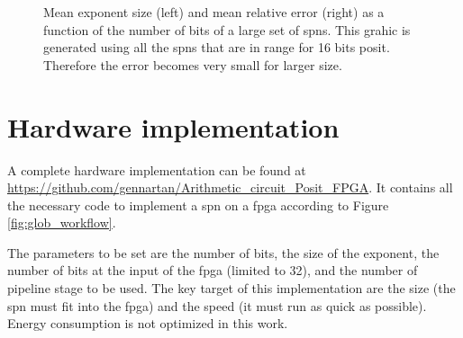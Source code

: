 \begin{figure}[!ht]
\begin{mdframed}
\centering
{}
\caption{Mean exponent size (left) and mean relative error (right) as a function of the number of bits of a large set of \glspl{spn}. This grahic is generated using all the \glspl{spn} that are in range for 16 bits posit. Therefore the error becomes very small for larger size.}
\label{fig:res_mean_2}
\end{mdframed}
\end{figure}

\section{Hardware implementation}

A complete hardware implementation can be found at \url{https://github.com/gennartan/Arithmetic_circuit_Posit_FPGA}. It contains all the necessary code to implement a \gls{spn} on a \gls{fpga} according to Figure \ref{fig:glob_workflow}.

The parameters to be set are the number of bits, the size of the exponent, the number of bits at the input of the \gls{fpga} (limited to 32), and the number of pipeline stage to be used. The key target of this implementation are the size (the \gls{spn} must fit into the \gls{fpga}) and the speed (it must run as quick as possible). Energy consumption is not optimized in this work.

